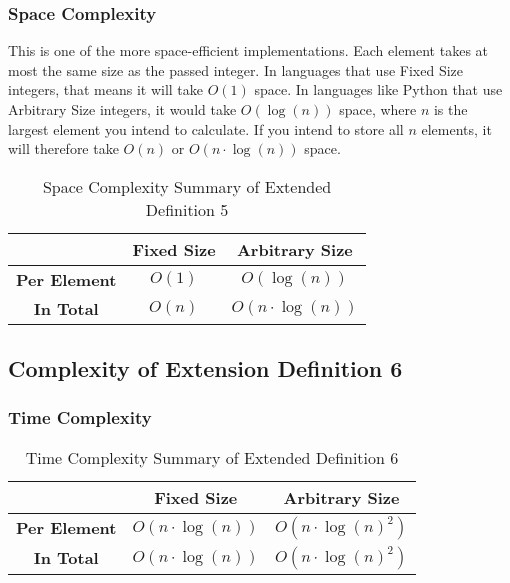 \documentclass[conference]{IEEEtran}
\begin{document}
\subsubsection{Space Complexity}

This is one of the more space-efficient implementations. Each element takes at most the same size as the passed integer. In languages that use Fixed Size integers, that means it will take $O(1)$ space. In languages like Python that use Arbitrary Size integers, it would take $O(\log(n))$ space, where $n$ is the largest element you intend to calculate. If you intend to store all $n$ elements, it will therefore take $O(n)$ or $O(n \cdot \log(n))$ space.

\begin{table}[H]
    \centering
    \caption{Space Complexity Summary of Extended Definition 5}
    \begin{tabular}{|c|c|c|}
        \hline
        & \textbf{Fixed Size} & \textbf{Arbitrary Size} \\
        \hline
        \textbf{Per Element} & $O(1)$ & $O(\log(n))$ \\
        \hline
        \textbf{In Total} & $O(n)$ & $O(n \cdot \log(n))$ \\
        \hline
    \end{tabular}
    \label{tab:space_pn_d05}
\end{table}

\subsection{Complexity of Extension Definition 6}
\label{ca:pn_d06}

\subsubsection{Time Complexity}

\renewcommand{\arraystretch}{1.25}
\begin{table}[H]
    \centering
    \caption{Time Complexity Summary of Extended Definition 6}
    \begin{tabular}{|c|c|c|}
        \hline
        & \textbf{Fixed Size} & \textbf{Arbitrary Size} \\
        \hline
        \textbf{Per Element} & $O(n \cdot \log(n))$ & $O\left(n \cdot \log(n)^2\right)$ \\
        \hline
        \textbf{In Total} & $O(n \cdot \log(n))$ & $O\left(n \cdot \log(n)^2\right)$ \\
        \hline
    \end{tabular}
    \label{tab:time_pn_d06}
\end{table}
\renewcommand{\arraystretch}{1}
\end{document}
